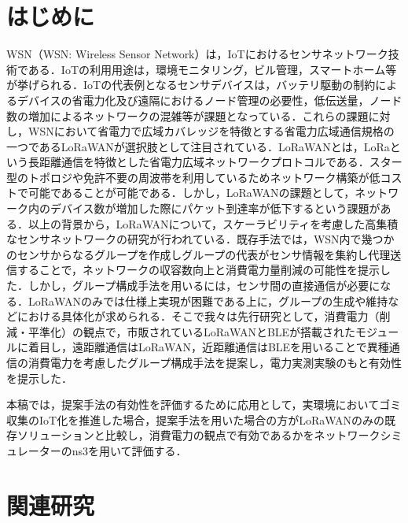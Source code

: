 \documentclass[Japanese]{dicomopapers}
\begin{document}
\section{はじめに}
WSN（WSN: Wireless Sensor Network）は，IoTにおけるセンサネットワーク技術である．IoTの利用用途は，環境モニタリング，ビル管理，スマートホーム等が挙げられる．IoTの代表例となるセンサデバイスは，バッテリ駆動の制約によるデバイスの省電力化及び遠隔におけるノード管理の必要性，低伝送量，ノード数の増加によるネットワークの混雑等が課題となっている．これらの課題に対し，WSNにおいて省電力で広域カバレッジを特徴とする省電力広域通信規格の一つであるLoRaWANが選択肢として注目されている．LoRaWANとは，LoRaという長距離通信を特徴とした省電力広域ネットワークプロトコルである．スター型のトポロジや免許不要の周波帯を利用しているためネットワーク構築が低コストで可能であることが可能である．しかし，LoRaWANの課題として，ネットワーク内のデバイス数が増加した際にパケット到達率が低下するという課題がある．以上の背景から，LoRaWANについて，スケーラビリティを考慮した高集積なセンサネットワークの研究が行われている．既存手法では，WSN内で幾つかのセンサからなるグループを作成しグループの代表がセンサ情報を集約し代理送信することで，ネットワークの収容数向上と消費電力量削減の可能性を提示した．しかし，グループ構成手法を用いるには，センサ間の直接通信が必要になる．LoRaWANのみでは仕様上実現が困難である上に，グループの生成や維持などにおける具体化が求められる．そこで我々は先行研究として，消費電力（削減・平準化）の観点で，市販されているLoRaWANとBLEが搭載されたモジュールに着目し，遠距離通信はLoRaWAN，近距離通信はBLEを用いることで異種通信の消費電力を考慮したグループ構成手法を提案し，電力実測実験のもと有効性を提示した．

\par
本稿では，提案手法の有効性を評価するために応用として，実環境においてゴミ収集のIoT化を推進した場合，提案手法を用いた場合の方がLoRaWANのみの既存ソリューションと比較し，消費電力の観点で有効であるかをネットワークシミュレーターのns3を用いて評価する．

\section{関連研究}
\end{document}
